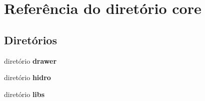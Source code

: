 \section{Referência do diretório core}
\label{dir_071d15eb6f8f8e54bc6101c4ba043608}
\subsection*{Diretórios}
\begin{DoxyCompactItemize}
\item 
diretório {\bf drawer}
\item 
diretório {\bf hidro}
\item 
diretório {\bf libs}
\end{DoxyCompactItemize}
